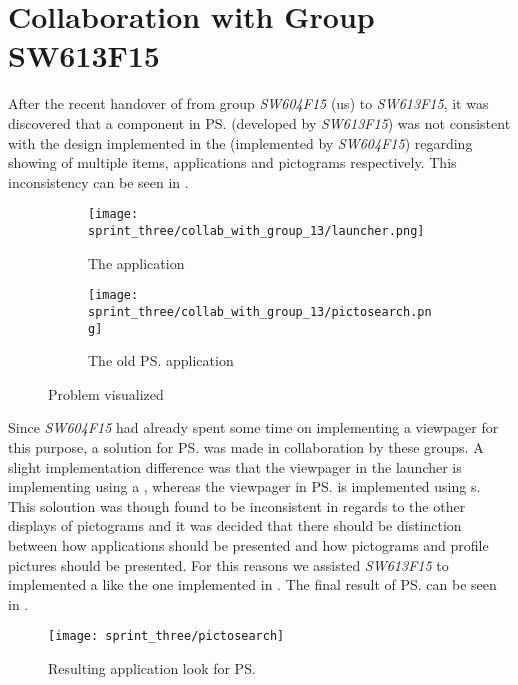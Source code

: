 
\section{Collaboration with Group SW613F15}
\label{sec:collaboration_with_group_sw613f15}

After the recent handover of \gc from group \emph{SW604F15} (us) to \emph{SW613F15}, it was discovered that a component in \ps (developed by \emph{SW613F15}) was not consistent with the design implemented in the \launcher (implemented by \emph{SW604F15}) regarding showing of multiple items, applications and pictograms respectively. This inconsistency can be seen in .

\begin{figure}[!htbp]
    \centering

    \begin{subfigure}[t]{0.75\textwidth}
        \texttt{[image: sprint\_three/collab\_with\_group\_13/launcher.png]}
        \caption{The \launcher application}
        \label{fig:collab_with_group_13_launhcer}
        \vspace*{1cm}
    \end{subfigure}
    \hfill
    \begin{subfigure}[t]{0.75\textwidth}
        \texttt{[image: sprint\_three/collab\_with\_group\_13/pictosearch.png]}
        \caption{The old \ps application}
        \label{fig:collab_with_group_13_pictosearch}
    \end{subfigure}
    
    \caption{Problem visualized}
    \label{fig:collab_with_group_13}
\end{figure}

Since \emph{SW604F15} had already spent some time on implementing a viewpager for this purpose, a solution for \ps was made in collaboration by these groups. A slight implementation difference was that the viewpager in the launcher is implementing using a , whereas the viewpager in \ps is implemented using s. This soloution was though found to be inconsistent in regards to the other displays of pictograms and it was decided that there should be distinction between how applications should be presented and how pictograms and profile pictures should be presented. For this reasons we assisted \emph{SW613F15} to implemented a  like the one implemented in \ct. The final result of \ps can be seen in .


\begin{figure}[!htbp]
    \centering
    \texttt{[image: sprint\_three/pictosearch]}
    \caption{Resulting application look for \ps}
    \label{fig:pictosearch}
\end{figure}